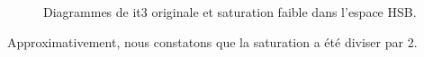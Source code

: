 \documentclass[a4paper,11pt]{article}
\begin{document}
\begin{figure}[H]
  \begin{center}  
    \caption{Diagrammes de it3 originale et saturation faible dans l'espace HSB.}
  \end{center}
\end{figure}

Approximativement, nous constatons que la saturation a été diviser par 
2.
\end{document}
